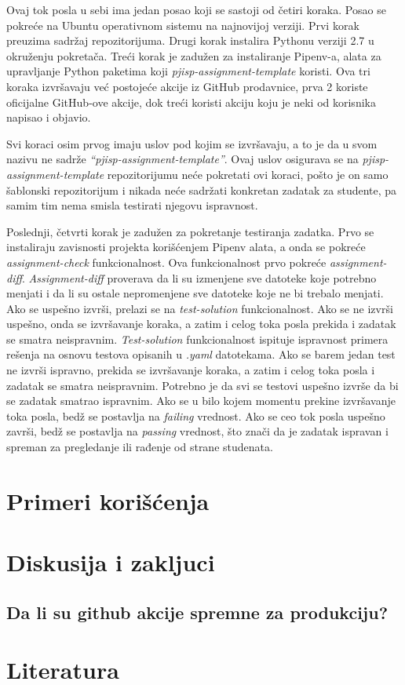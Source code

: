 \documentclass[12pt]{report}
\begin{document}
Ovaj tok posla u sebi ima jedan posao koji se sastoji od četiri koraka. Posao se pokreće na Ubuntu operativnom sistemu na najnovijoj verziji. Prvi korak preuzima sadržaj repozitorijuma. Drugi korak instalira Pythonu verziji 2.7 u okruženju pokretača. Treći korak je zadužen za instaliranje Pipenv-a, alata za upravljanje Python paketima koji \textit{pjisp-assignment-template} koristi. Ova tri koraka izvršavaju već postojeće akcije iz GitHub prodavnice, prva 2 koriste oficijalne GitHub-ove akcije, dok treći koristi akciju koju je neki od korisnika napisao i objavio.

Svi koraci osim prvog imaju uslov pod kojim se izvršavaju, a to je da u svom nazivu ne sadrže \textit{``pjisp-assignment-template''}. Ovaj uslov osigurava se na \textit{pjisp-assignment-template} repozitorijumu neće pokretati ovi koraci, pošto je on samo šablonski repozitorijum i nikada neće sadržati konkretan zadatak za studente, pa samim tim nema smisla testirati njegovu ispravnost.

Poslednji, četvrti korak je zadužen za pokretanje testiranja zadatka. Prvo se instaliraju zavisnosti projekta korišćenjem Pipenv alata, a onda se pokreće \textit{assignment-check} funkcionalnost. Ova funkcionalnost prvo pokreće \textit{assignment-diff}. \textit{Assignment-diff} proverava da li su izmenjene sve datoteke koje potrebno menjati i da li su ostale nepromenjene sve datoteke koje ne bi trebalo menjati. Ako se uspešno izvrši, prelazi se na \textit{test-solution} funkcionalnost. Ako se ne izvrši uspešno, onda se izvršavanje koraka, a zatim i celog toka posla prekida i zadatak se smatra neispravnim. \textit{Test-solution} funkcionalnost ispituje ispravnost primera rešenja na osnovu testova opisanih u \textit{.yaml} datotekama. Ako se barem jedan test ne izvrši ispravno, prekida se izvršavanje koraka, a zatim i celog toka posla i zadatak se smatra neispravnim. Potrebno je da svi se testovi uspešno izvrše da bi se zadatak smatrao ispravnim. Ako se u bilo kojem momentu prekine izvršavanje toka posla, bedž se postavlja na \textit{failing} vrednost. Ako se ceo tok posla uspešno završi, bedž se postavlja na \textit{passing} vrednost, što znači da je zadatak ispravan i spreman za pregledanje ili rađenje od strane studenata.

\chapter{Primeri korišćenja}
\chapter{Diskusija i zakljuci}
\section{Da li su github akcije spremne za produkciju?}
\chapter{Literatura}
\sloppy
\printbibliography[heading=none]
\end{document}
